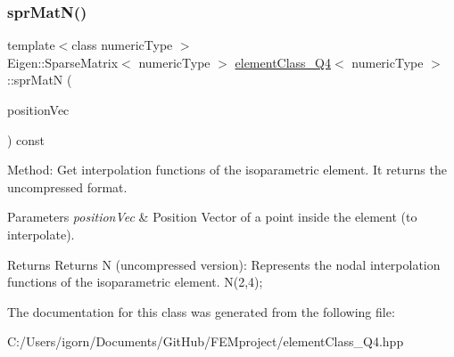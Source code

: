 \subsubsection{\texorpdfstring{spr\+Mat\+N()}{sprMatN()}}
{\footnotesize\ttfamily template$<$class numeric\+Type $>$ \\
Eigen\+::\+Sparse\+Matrix$<$ numeric\+Type $>$ \mbox{\hyperlink{classelement_class___q4}{element\+Class\+\_\+\+Q4}}$<$ numeric\+Type $>$\+::spr\+MatN (\begin{DoxyParamCaption}\item[{const Matrix$<$ numeric\+Type, 2, 1 $>$ \&}]{position\+Vec }\end{DoxyParamCaption}) const}

Method\+: Get interpolation functions of the isoparametric element. It returns the uncompressed format. 
\begin{DoxyParams}{Parameters}
{\em position\+Vec} & Position Vector of a point inside the element (to interpolate). \\
\hline
\end{DoxyParams}
\begin{DoxyReturn}{Returns}
Returns N (uncompressed version)\+: Represents the nodal interpolation functions of the isoparametric element. N(2,4); 
\end{DoxyReturn}


The documentation for this class was generated from the following file\+:\begin{DoxyCompactItemize}
\item 
C\+:/\+Users/igorn/\+Documents/\+Git\+Hub/\+F\+E\+Mproject/element\+Class\+\_\+\+Q4.\+hpp\end{DoxyCompactItemize}
